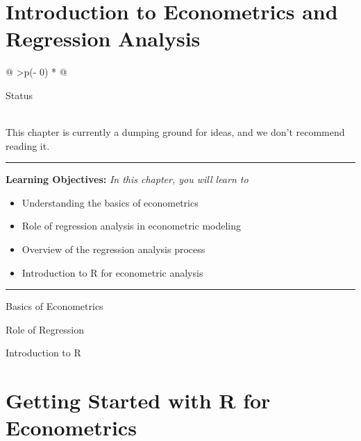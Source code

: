 \documentclass[
  letterpaper,
  paper =a4,
  twoside,
  openright,
  headsepline,
  footsepline,
  listof = totocnumbered,
  chapterprefix = true,
  firstiscover]{scrbook}
\providecommand{\abstractname}{Learning Objectives} %
\newenvironment{objectives}[1]{%
	\hrule
	\vspace{5pt}
	\small\textbf{\abstractname: } 
	\newline
	\vspace{0.1cm}
	\small\emph{#1} %
	\itshape %
}{%
	\vspace{5pt}
	\hrule
	\vspace{0.6cm}
}
\begin{document}

\hypertarget{introduction-to-econometrics-and-regression-analysis}{%
\chapter{Introduction to Econometrics and Regression
Analysis}\label{introduction-to-econometrics-and-regression-analysis}}

\begin{longtable}[]{@{}
  >{\centering\arraybackslash}p{(\columnwidth - 0\tabcolsep) * }@{}}
\toprule\noalign{}
\begin{minipage}[b]{\linewidth}\centering
Status
\end{minipage} \\
\midrule\noalign{}
\endhead
\bottomrule\noalign{}
\endlastfoot
This chapter is currently a dumping ground for ideas, and we don't
recommend reading it. \\
\end{longtable}

\begin{objectives}{In this chapter, you will learn to}
\begin{itemize}

\item{Understanding the basics of econometrics}

\item{Role of regression analysis in econometric modeling}

\item{Overview of the regression analysis process}

\item{Introduction to R for econometric analysis}

\end{itemize}

\end{objectives}

Basics of Econometrics

Role of Regression

Introduction to R


\hypertarget{getting-started-with-r-for-econometrics}{%
\chapter{Getting Started with R for
Econometrics}\label{getting-started-with-r-for-econometrics}}
\end{document}
